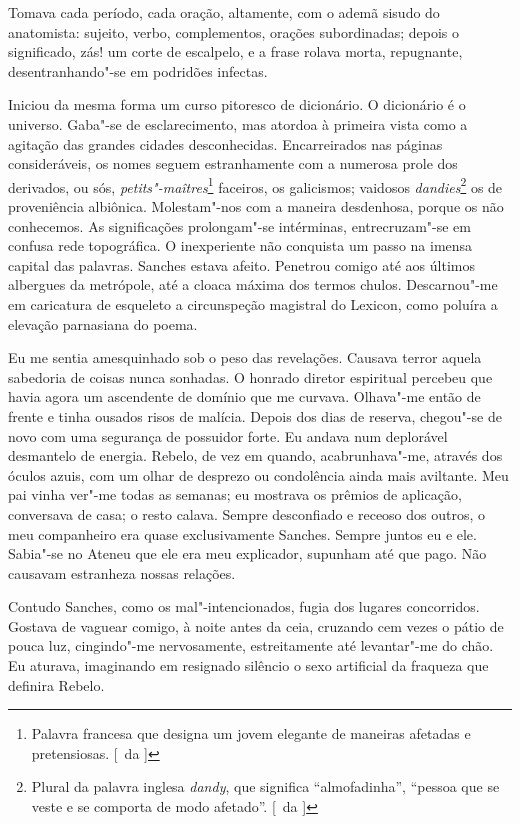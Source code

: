 Tomava cada período, cada oração,
altamente, com o ademã sisudo do anatomista: sujeito, verbo,
complementos, orações subordinadas; depois o significado, zás! um corte
de escalpelo, e a frase rolava morta, repugnante, desentranhando"-se
em podridões infectas. 

Iniciou da mesma forma um curso pitoresco de
dicionário. O dicionário é o universo. Gaba"-se de esclarecimento, mas
atordoa à primeira vista como a agitação das grandes cidades
desconhecidas. Encarreirados nas páginas consideráveis, os nomes seguem
estranhamente com a numerosa prole dos derivados, ou sós,
\textit{petits"-maîtres}\footnote{ Palavra francesa que designa um jovem elegante 
de maneiras afetadas e pretensiosas. [~da ]} 
faceiros, os galicismos; vaidosos \textit{dandies}\footnote{ Plural da palavra 
inglesa \textit{dandy}, que significa ``almofadinha'', 
``pessoa que se veste e se comporta de modo afetado''. [~da ]} os de
proveniência albiônica. Molestam"-nos com a maneira desdenhosa, porque
os não conhecemos. As significações prolongam"-se intérminas,
entrecruzam"-se em confusa rede topográfica. O inexperiente não
conquista um passo na imensa capital das palavras. Sanches estava
afeito. Penetrou comigo até aos últimos albergues da metrópole, até a cloaca máxima dos termos chulos.
Descarnou"-me em caricatura de esqueleto a circunspeção magistral do
Lexicon, como poluíra a elevação parnasiana do poema. 

Eu me sentia amesquinhado sob o peso das revelações. Causava terror aquela sabedoria
de coisas nunca sonhadas. O honrado diretor espiritual percebeu que
havia agora um ascendente de domínio que me curvava. Olhava"-me então
de frente e tinha ousados risos de malícia. Depois dos dias de reserva,
chegou"-se de novo com uma segurança de possuidor forte. Eu andava num
deplorável desmantelo de energia. Rebelo, de vez em quando,
acabrunhava"-me, através dos óculos azuis, com um olhar de desprezo ou
condolência ainda mais aviltante. Meu pai vinha ver"-me todas as
semanas; eu mostrava os prêmios de aplicação, conversava de casa; o
resto calava. Sempre desconfiado e receoso dos outros, o meu
companheiro era quase exclusivamente Sanches. Sempre juntos eu e ele.
Sabia"-se no Ateneu que ele era meu explicador, supunham até que pago.
Não causavam estranheza nossas relações. 

Contudo Sanches, como os mal"-intencionados, fugia dos lugares concorridos. 
Gostava de vaguear comigo, à noite antes da ceia, cruzando cem vezes o pátio de pouca luz,
cingindo"-me nervosamente, estreitamente até levantar"-me do chão. Eu
aturava, imaginando em resignado silêncio o sexo artificial da fraqueza
que definira Rebelo. 

